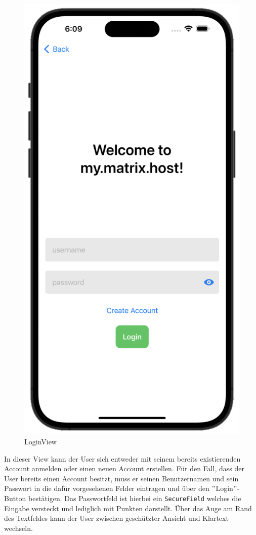     \begin{figure}[h]
        \includegraphics[scale=0.5]{login_white}
        \centering
        \caption{LoginView}\label{fig:loginview}
    \end{figure}
    In dieser View kann der User sich entweder mit seinem bereits existierenden Account anmelden oder einen neuen Account erstellen.
    Für den Fall, dass der User bereits einen Account besitzt, muss er seinen Benutzernamen und sein Passwort in die dafür vorgesehenen Felder eintragen und über den \("\)Login\("\)-Button bestätigen.
    Das Passwortfeld ist hierbei ein \texttt{SecureField} welches die Eingabe versteckt und lediglich mit Punkten darstellt.
    Über das Auge am Rand des Textfeldes kann der User zwischen geschützter Ansicht und Klartext wechseln.

